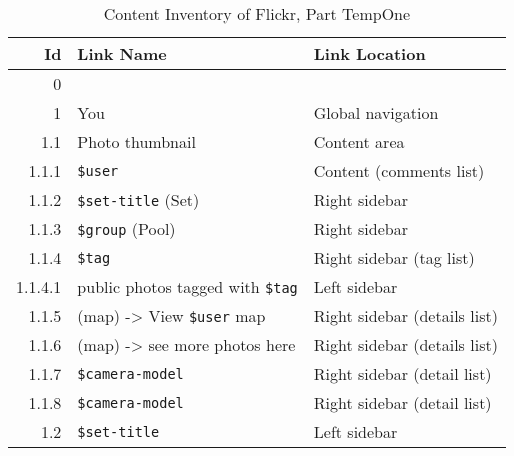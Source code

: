 \documentclass[11pt,a4paper]{article}
\newcommand{\var}[1]{\texttt{\${#1}}}
\begin{document}
\begin{table}[h!b!p!]
  \caption{Content Inventory of Flickr, Part TempOne}
  \label{table:flickr.content.inventory.tmp1}
  \begin{center}
    \begin{small}
      \begin{tabular}{|r|l|l|}
        \hline
        Id &
        Link Name &
        Link Location \\

        \hline

        0 &
        &
        \\

        1 &
        You &
        Global navigation \\

          1.1 &
          Photo thumbnail &
          Content area \\

            1.1.1 &
            \var{user} &
            Content (comments list) \\

            1.1.2 &
            \var{set-title} (Set) &
            Right sidebar \\

            1.1.3 &
            \var{group} (Pool) &
            Right sidebar \\

            1.1.4 &
            \var{tag} &
            Right sidebar (tag list) \\

              1.1.4.1 &
              public photos tagged with \var{tag} &
              Left sidebar \\

                1.1.5 &
                (map) -> View \var{user} map &
                Right sidebar (details list) \\

                1.1.6 &
                (map) -> see more photos here &
                Right sidebar (details list) \\

                1.1.7 &
                \var{camera-model} &
                Right sidebar (detail list) \\

                1.1.8 &
                \var{camera-model} &
                Right sidebar (detail list) \\

              1.2 &
              \var{set-title} &
              Left sidebar \\


\end{tabular}
\end{small}
\end{center}
\end{table}
\end{document}
